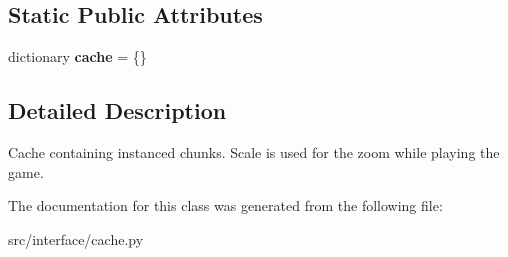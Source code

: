 \subsection*{\-Static \-Public \-Attributes}
\begin{DoxyCompactItemize}
\item 
\hypertarget{classinterface_1_1cache_1_1_chunk_cache_a5fc8e93b1ff937abe96a96a0dc99d4be}{dictionary {\bfseries cache} = \{\}}\label{classinterface_1_1cache_1_1_chunk_cache_a5fc8e93b1ff937abe96a96a0dc99d4be}

\end{DoxyCompactItemize}


\subsection{\-Detailed \-Description}
\begin{DoxyVerb}
Cache containing instanced chunks. Scale is used for the zoom while
playing the game.
\end{DoxyVerb}
 

\-The documentation for this class was generated from the following file\-:\begin{DoxyCompactItemize}
\item 
src/interface/cache.\-py\end{DoxyCompactItemize}
